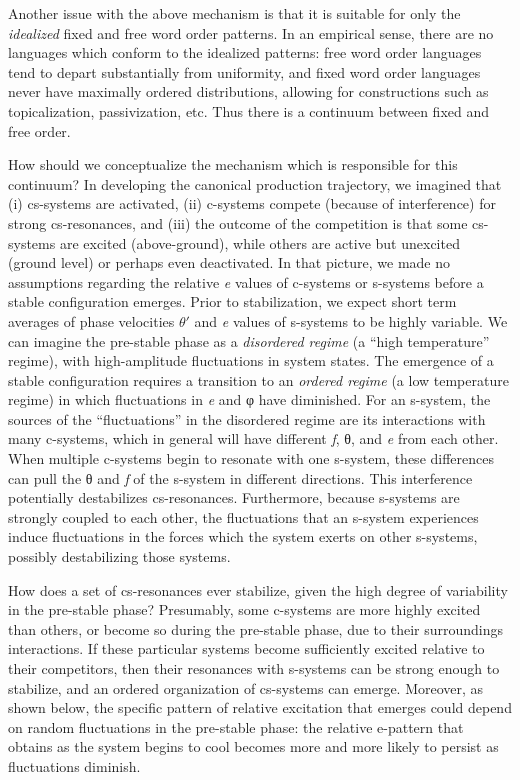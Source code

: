   Another issue with the above mechanism is that it is suitable for only the \textit{idealized} fixed and free word order patterns. In an empirical sense, there are no languages which conform to the idealized patterns: free word order languages tend to depart substantially from uniformity, and fixed word order languages never have maximally ordered distributions, allowing for constructions such as topicalization, passivization, etc. Thus there is a continuum between fixed and free order. 

  How should we conceptualize the mechanism which is responsible for this continuum? In developing the canonical production trajectory, we imagined that (i) cs-systems are activated, (ii) c-systems compete (because of interference) for strong cs-resonances, and (iii) the outcome of the competition is that some cs-systems are excited (above-ground), while others are active but unexcited (ground level) or perhaps even deactivated. In that picture, we made no assumptions regarding the relative \textit{e} values of c-systems or s-systems before a stable configuration emerges. Prior to stabilization, we expect short term averages of phase velocities $\theta ′$ and \textit{e} values of s-systems to be highly variable. We can imagine the pre-stable phase as a \textit{disordered regime} (a “high temperature” regime), with high-amplitude fluctuations in system states. The emergence of a stable configuration requires a transition to an \textit{ordered regime} (a low temperature regime) in which fluctuations in \textit{e} and φ have diminished. For an s-system, the sources of the “fluctuations” in the disordered regime are its interactions with many c-systems, which in general will have different \textit{f}, θ, and \textit{e} from each other. When multiple c-systems begin to resonate with one s-system, these differences can pull the θ and \textit{f} of the s-system in different directions. This interference potentially destabilizes cs-resonances. Furthermore, because s-systems are strongly coupled to each other, the fluctuations that an s-system experiences induce fluctuations in the forces which the system exerts on other s-systems, possibly destabilizing those systems.

  How does a set of cs-resonances ever stabilize, given the high degree of variability in the pre-stable phase? Presumably, some c-systems are more highly excited than others, or become so during the pre-stable phase, due to their surroundings interactions. If these particular systems become sufficiently excited relative to their competitors, then their resonances with s-systems can be strong enough to stabilize, and an ordered organization of cs-systems can emerge. Moreover, as shown below, the specific pattern of relative excitation that emerges could depend on random fluctuations in the pre-stable phase: the relative e-pattern that obtains as the system begins to cool becomes more and more likely to persist as fluctuations diminish.

